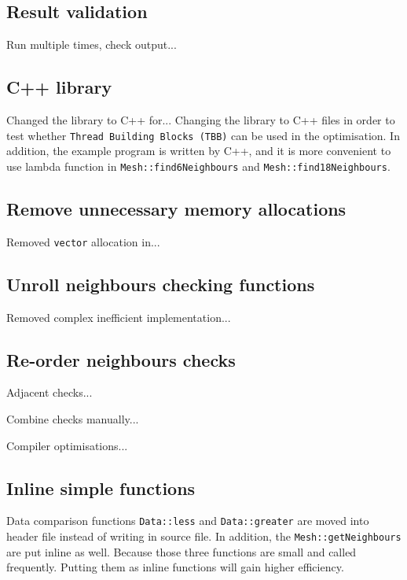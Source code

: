\documentclass[conference]{IEEEtran}
\begin{document}
\subsection{Result validation}

Run multiple times, check output...


\subsection{C++ library}

Changed the library to C++ for...
Changing the library to C++ files in order to test whether \texttt{Thread Building Blocks (TBB)} can be used in the optimisation. In addition, the example program is written by C++, and it is more convenient to use lambda function in \texttt{Mesh::find6Neighbours} and \texttt{Mesh::find18Neighbours}. 

\subsection{Remove unnecessary memory allocations}

Removed \texttt{vector} allocation in...

\subsection{Unroll neighbours checking functions}

Removed complex inefficient implementation...

\subsection{Re-order neighbours checks}

Adjacent checks...

Combine checks manually...

Compiler optimisations...

\subsection{Inline simple functions}

Data comparison functions \texttt{Data::less} and \texttt{Data::greater} are moved into header file instead of writing in source file. In addition, the \texttt{Mesh::getNeighbours} are put inline as well. Because those three functions are small and called frequently. Putting them as inline functions will gain higher efficiency. 
\end{document}
